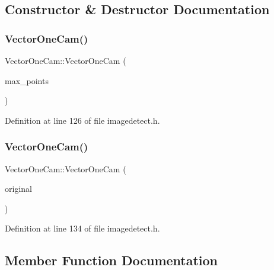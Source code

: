 \subsection{Constructor \& Destructor Documentation}
\mbox{\label{struct_vector_one_cam_afa5cf86b4937421b8d5b67f6db71cd54}} 
\subsubsection{\texorpdfstring{VectorOneCam()}{VectorOneCam()}\hspace{0.1cm}{\footnotesize\ttfamily [1/2]}}
{\footnotesize\ttfamily Vector\+One\+Cam\+::\+Vector\+One\+Cam (\begin{DoxyParamCaption}\item[{int}]{max\+\_\+points }\end{DoxyParamCaption})\hspace{0.3cm}{\ttfamily [inline]}}



Definition at line 126 of file imagedetect.\+h.

\mbox{\label{struct_vector_one_cam_ac940047671878f6d2220bf548255fe6e}} 
\subsubsection{\texorpdfstring{VectorOneCam()}{VectorOneCam()}\hspace{0.1cm}{\footnotesize\ttfamily [2/2]}}
{\footnotesize\ttfamily Vector\+One\+Cam\+::\+Vector\+One\+Cam (\begin{DoxyParamCaption}\item[{const \mbox{\hyperlink{struct_vector_one_cam}{Vector\+One\+Cam}} \&}]{original }\end{DoxyParamCaption})\hspace{0.3cm}{\ttfamily [inline]}}



Definition at line 134 of file imagedetect.\+h.



\subsection{Member Function Documentation}
\mbox{\label{struct_vector_one_cam_a08ff98d8cc920d174b7d1cd15f9c4275}} 

